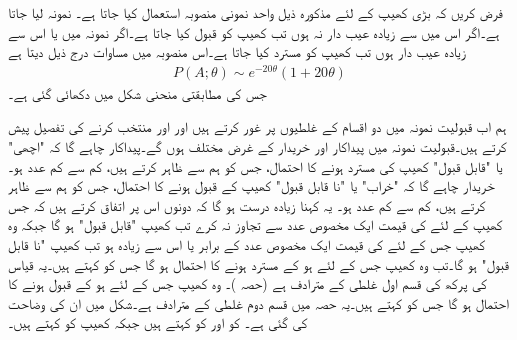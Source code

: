 \quad
فرض کریں کہ بڑی کھیپ کے لئے مذکورہ ذیل واحد نمونی منصوبہ استعمال کیا جاتا ہے۔ نمونہ لیا جاتا ہے۔اگر اس میں  سے زیادہ عیب دار نہ ہوں تب کھیپ کو قبول کیا جاتا ہے۔اگر نمونہ میں  یا اس سے زیادہ عیب دار ہوں تب کھیپ کو مسترد کیا جاتا ہے۔اس منصوبہ میں مساوات  درج ذیل دیتا ہے
\begin{align*}
P(A;\theta)\sim e^{-20\theta} (1+20\theta)
\end{align*}
جس کی مطابقتی منحنی شکل  میں دکھائی گئی ہے۔

ہم اب قبولیت نمونہ میں دو اقسام کے غلطیوں پر غور کرتے ہیں اور  اور  منتخب کرنے کی تفصیل پیش کرتے ہیں۔قبولیت نمونہ میں پیداکار اور خریدار کے غرض مختلف ہوں گے۔پیداکار چاہے گا کہ "اچھی" یا "قابل قبول" کھیپ کی مسترد ہونے کا احتمال، جس کو ہم  سے ظاہر کرتے ہیں، کم سے کم  عدد  ہو۔ خریدار چاہے گا کہ "خراب" یا "نا قابل قبول" کھیپ کے قبول ہونے کا احتمال، جس کو ہم  سے ظاہر کرتے ہیں، کم سے کم عدد ہو۔ یہ کہنا زیادہ درست ہو گا کہ دونوں اس پر اتفاق کرتے ہیں کہ جس کھیپ کے لئے  کی قیمت ایک مخصوص عدد  سے تجاوز نہ کرے تب کھیپ "قابل قبول"  ہو  گا جبکہ وہ کھیپ جس کے لئے   کی قیمت ایک مخصوص عدد   کے برابر یا اس  سے زیادہ ہو تب کھیپ "نا قابل قبول" ہو گا۔تب وہ کھیپ جس کے لئے  ہو کے مسترد ہونے  کا احتمال  ہو گا جس کو  کہتے ہیں۔یہ قیاس کی پرکھ کی قسم اول غلطی  کے مترادف ہے (حصہ )۔  وہ کھیپ جس کے لئے  ہو کے قبول ہونے  کا احتمال  ہو گا جس کو  کہتے ہیں۔یہ حصہ  میں قسم دوم  غلطی  کے مترادف ہے۔شکل  میں ان کی وضاحت کی گئی ہے۔  کو  اور  کو  کہتے ہیں جبکہ کھیپ  کو  کہتے ہیں۔

